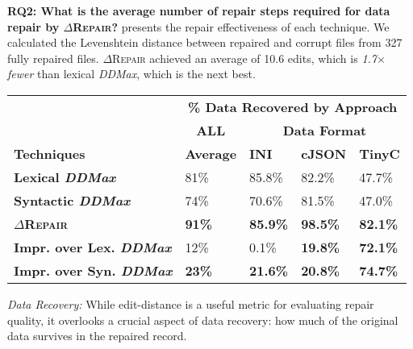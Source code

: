 \documentclass[acmsmall,screen,review,anonymous]{acmart}
\newcommand{\dtask}{data repair\xspace}
\newcommand{\approach}{\textsc{$\Delta$Repair}\xspace}
\newcommand{\ddmax}{\textit{DDMax}\xspace}
\newcommand{\drepair}{\approach}
\begin{document}
\noindent\textbf{RQ2: What is the average number of repair steps required for \dtask by \drepair?}
%
 presents the repair effectiveness of each technique.
We calculated the Levenshtein distance between repaired and corrupt files
from 327 fully repaired files.
\drepair achieved an average of 10.6 edits, which is \emph{1.7$\times$ fewer} than lexical \ddmax,
which is the next best.

%

\begin{table*}[!tbp]\centering
\caption{Data Recovery (percentage of original data remaining) of \approach vs
lexical \ddmax and syntactic \ddmax. 
The highest data recovery and lowest data loss are in bold.}
\begin{tabular}{|p{4.0cm}|p{1.5cm}|p{1.5cm}|p{1.5cm}|p{1.5cm}|}
\hline
 &  \multicolumn{4}{c|}{\textbf{\% Data Recovered by Approach}} \\
&  \multicolumn{1}{c|}{\textbf{ALL}} & \multicolumn{3}{c|}{\textbf{Data Format}}  \\
\textbf{Techniques} & \textbf{Average} & \textbf{INI} & \textbf{cJSON} & \textbf{TinyC} \\
\hline
\textbf{Lexical \ddmax} & 81\%  & 85.8\% & 82.2\%   & 47.7\% \\
\textbf{Syntactic \ddmax} & 74\%  &  70.6\% & 81.5\%  & 47.0\% \\
\hline
\textbf{\approach} & \textbf{91\%}  &  \textbf{85.9\%} & \textbf{98.5\%} & \textbf{82.1\%} \\
\hline
\textbf{Impr. over Lex. \ddmax} & 12\% &  0.1\%  & \textbf{19.8\%} & \textbf{72.1\%} \\
\textbf{Impr. over Syn. \ddmax} & \textbf{23\%}  &  \textbf{21.6\%}  & \textbf{20.8\%} & \textbf{74.7\% }  \\
\hline
\end{tabular}
\label{tab:datarecovery}
\end{table*}


\noindent\emph{Data Recovery:}
While edit-distance is a useful metric for evaluating repair quality,
it overlooks a crucial aspect of data recovery: how much of the original
data survives in the repaired record.
\end{document}
